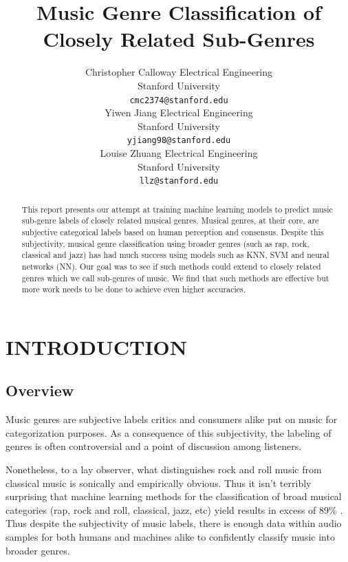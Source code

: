 \documentclass[letterpaper, 12 pt, conference]{ieeeconf}  %
\title{\LARGE \bf
Music Genre Classification of Closely Related Sub-Genres 
}
\author{ \parbox{2 in}{\centering Christopher Calloway
        Electrical Engineering\\
       Stanford University\\
        {\tt\small cmc2374@stanford.edu}}
        \hspace*{ 0.5 in}
        \parbox{2 in}{ \centering Yiwen Jiang
        Electrical Engineering \\
        Stanford University\\
        {\tt\small yjiang98@stanford.edu}}
          \hspace*{ 0.5 in}
        \parbox{2 in}{ \centering Louise Zhuang
        Electrical Engineering \\
        Stanford University\\
        {\tt\small llz@stanford.edu}}
}
\begin{document}
\maketitle
\thispagestyle{empty}
\pagestyle{empty}


\begin{abstract}

This report presents our attempt at training machine learning models to predict music sub-genre labels of closely related musical genres. Musical genres, at their core, are subjective categorical labels based on human perception and consensus. Despite this subjectivity, musical genre classification using broader genres (such as rap, rock, classical and jazz) has had much success using models such as KNN, SVM and neural networks (NN). Our goal was to see if such methods could extend to closely related genres  which we call sub-genres of music. We find that such methods are effective but more work needs to be done to achieve even higher accuracies. 




\end{abstract}


\section{INTRODUCTION}

\subsection{Overview}

Music genres are subjective labels critics and consumers alike put on music for categorization purposes. 
As a consequence of this subjectivity, the labeling of genres is often controversial and a point of discussion among listeners. 

Nonetheless, to a lay observer, what distinguishes rock and roll music from classical music is sonically and empirically obvious. Thus it isn't terribly surprising that machine learning methods for the classification of broad musical categories (rap, rock and roll, classical, jazz, etc) yield results in excess of 89\% \cite{c1, c2, c3}. Thus despite the subjectivity of music labels, there is enough data within audio samples for both humans and machines alike to confidently classify music into broader genres.
\end{document}
